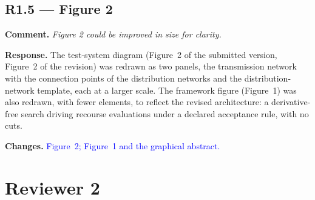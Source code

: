 \documentclass[11pt]{article}
\newcommand{\rcomment}[1]{\par\medskip\noindent\textbf{Comment.} \textit{#1}\par\smallskip}
\newcommand{\rresponse}[1]{\noindent\textbf{Response.} #1\par\smallskip}
\newcommand{\rchanges}[1]{\noindent\textbf{Changes.} \textcolor{blue}{#1}\par\medskip}
\begin{document}
\subsection*{R1.5 --- Figure 2}
\rcomment{Figure 2 could be improved in size for clarity.}
\rresponse{The test-system diagram (Figure~2 of the submitted version, Figure~2 of the revision) was redrawn as two panels, the transmission network with the connection points of the distribution networks and the distribution-network template, each at a larger scale. The framework figure (Figure~1) was also redrawn, with fewer elements, to reflect the revised architecture: a derivative-free search driving recourse evaluations under a declared acceptance rule, with no cuts.}
\rchanges{Figure~2; Figure~1 and the graphical abstract.}

\section*{Reviewer 2}
\end{document}

